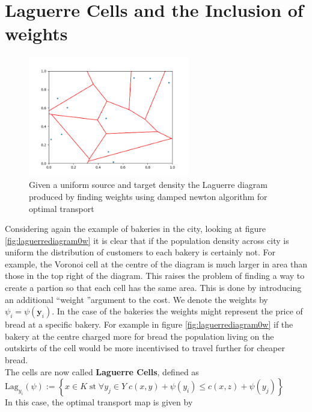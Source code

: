 \section{Laguerre Cells and the Inclusion of weights}
 \begin{figure}[h]
	\centering
	\includegraphics[width=7cm]{project/laguerre_diagram_OTw}
	\caption[Laguerre diagram produced by finding weights using damped newton algorithm for optimal transport]{Given a uniform source and target density the Laguerre diagram produced by finding weights using damped newton algorithm for optimal transport}
	\label{fig:laguerrediagramotw}
\end{figure}
Considering again the example of bakeries in the city, looking at figure \ref{fig:laguerrediagram0w} it is clear that if the population density across city is uniform the distribution of customers to each bakery is certainly not. For example, the Voronoi cell at the centre of the diagram is much larger in area than those in the top right of the diagram. This raises the problem of finding a way to create a partion so that each cell has the same area. This is done by introducing an additional \textquotedblleft weight \textquotedblright  argument to the cost. We denote the weights by $\psi_i = \psi\left(\bm{y}_i\right)$. In the case of the bakeries the weights might represent the price of bread at a specific bakery. For example in figure \ref{fig:laguerrediagram0w} if the bakery at the centre charged more for bread the population living on the outskirts of the cell would be more incentivised to travel further for cheaper bread.\\
\linebreak
The cells are now called  \textbf{Laguerre Cells}, defined as \\ $\text{Lag}_{y_i}(\psi) := \left\lbrace x \in K \; \text{st} \; \forall y_j \in Y \; c(x,y) + \psi(y_i) \leq c(x,z) + \psi(y_j) \right\rbrace$ \\ 
\linebreak 
In this case, the optimal transport map is given by \\
